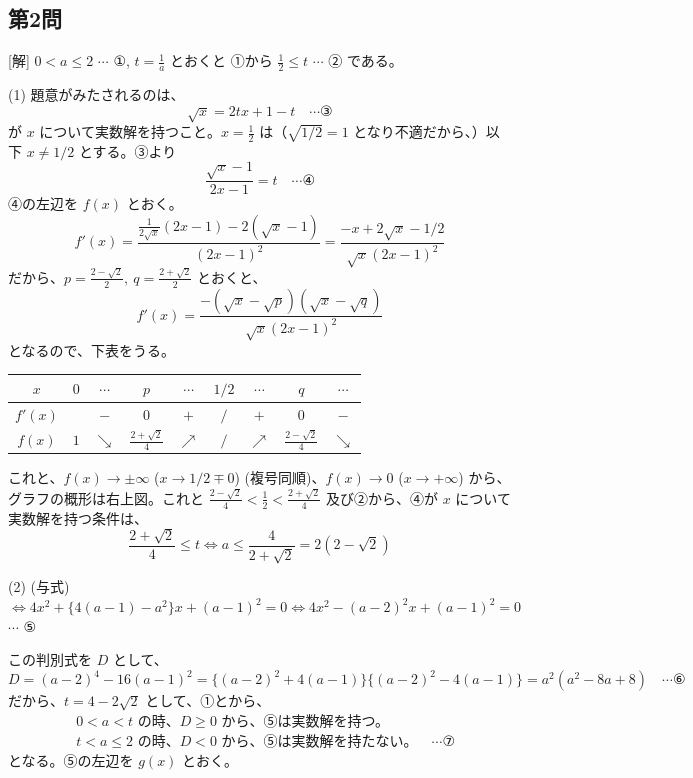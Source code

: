 \documentclass[../main.tex]{subfiles}
\begin{document}
\subsection*{第2問}
[解] $0 < a \le 2$ $\cdots$ ①, $t = \frac{1}{a}$ とおくと ①から $\frac{1}{2} \le t$ $\cdots$ ② である。

(1) 題意がみたされるのは、
\[ \sqrt{x} = 2tx + 1 - t \quad \cdots \text{③} \]
が $x$ について実数解を持つこと。$x = \frac{1}{2}$ は（$\sqrt{1/2} = 1$ となり不適だから、）以下 $x \neq 1/2$ とする。③より
\[ \frac{\sqrt{x}-1}{2x-1} = t \quad \cdots \text{④} \]
④の左辺を $f(x)$ とおく。
\[ f'(x) = \frac{\frac{1}{2\sqrt{x}}(2x-1) - 2(\sqrt{x}-1)}{(2x-1)^2} = \frac{-x + 2\sqrt{x} - 1/2}{\sqrt{x}(2x-1)^2} \]
だから、$p = \frac{2-\sqrt{2}}{2}, \ q = \frac{2+\sqrt{2}}{2}$ とおくと、
\[ f'(x) = \frac{-(\sqrt{x}-\sqrt{p})(\sqrt{x}-\sqrt{q})}{\sqrt{x}(2x-1)^2} \]
となるので、下表をうる。

\begin{center}
  \begin{tabular}{|c|c|c|c|c|c|c|c|c|}
    \hline
    $x$ & $0$ & $\cdots$ & $p$ & $\cdots$ & $1/2$ & $\cdots$ & $q$ & $\cdots$ \\ \hline
    $f'(x)$ & & $-$ & $0$ & $+$ & $/$ & $+$ & $0$ & $-$ \\ \hline
    $f(x)$ & $1$ & $\searrow$ & $\frac{2+\sqrt{2}}{4}$ & $\nearrow$ & $/$ & $\nearrow$ & $\frac{2-\sqrt{2}}{4}$ & $\searrow$ \\ \hline
  \end{tabular}
\end{center}

これと、$f(x) \to \pm\infty$ ($x \to 1/2 \mp 0$) (複号同順)、$f(x) \to 0$ ($x \to +\infty$) から、グラフの概形は右上図。これと $\frac{2-\sqrt{2}}{4} < \frac{1}{2} < \frac{2+\sqrt{2}}{4}$ 及び②から、④が $x$ について実数解を持つ条件は、
\[ \frac{2+\sqrt{2}}{4} \le t \iff a \le \frac{4}{2+\sqrt{2}} = 2(2-\sqrt{2}) \]

(2) (与式) $\iff 4x^2 + \{4(a-1)-a^2\}x + (a-1)^2 = 0 \iff 4x^2 - (a-2)^2 x + (a-1)^2 = 0$ $\cdots$ ⑤

この判別式を $D$ として、
\[ D = (a-2)^4 - 16(a-1)^2 = \{(a-2)^2 + 4(a-1)\}\{(a-2)^2 - 4(a-1)\} = a^2(a^2-8a+8) \quad \cdots \text{⑥} \]
だから、$t = 4-2\sqrt{2}$ として、①とから、
\begin{align*}
  &0 < a < t \text{ の時、} D \ge 0 \text{ から、⑤は実数解を持つ。} \\
  &t < a \le 2 \text{ の時、} D < 0 \text{ から、⑤は実数解を持たない。} \quad \cdots \text{⑦}
\end{align*}
となる。⑤の左辺を $g(x)$ とおく。
\end{document}
